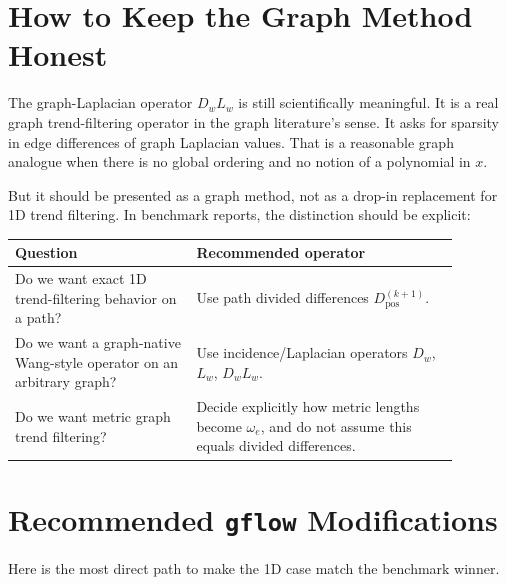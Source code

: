 \documentclass[11pt]{article}
\begin{document}
\section{How to Keep the Graph Method Honest}

The graph-Laplacian operator \(D_wL_w\) is still scientifically meaningful.  It
is a real graph trend-filtering operator in the graph literature's sense.  It
asks for sparsity in edge differences of graph Laplacian values.  That is a
reasonable graph analogue when there is no global ordering and no notion of a
polynomial in \(x\).

But it should be presented as a graph method, not as a drop-in replacement for
1D trend filtering.  In benchmark reports, the distinction should be explicit:

\begin{center}
\begin{tabular}{p{0.36\linewidth}p{0.52\linewidth}}
\toprule
Question & Recommended operator\\
\midrule
Do we want exact 1D trend-filtering behavior on a path? &
Use path divided differences \(D^{(k+1)}_{\mathrm{pos}}\).\\
Do we want a graph-native Wang-style operator on an arbitrary graph? &
Use incidence/Laplacian operators \(D_w\), \(L_w\), \(D_wL_w\).\\
Do we want metric graph trend filtering? &
Decide explicitly how metric lengths become \(\omega_e\), and do not assume
this equals divided differences.\\
\bottomrule
\end{tabular}
\end{center}

\section{Recommended \texttt{gflow} Modifications}

Here is the most direct path to make the 1D case match the benchmark winner.
\end{document}
